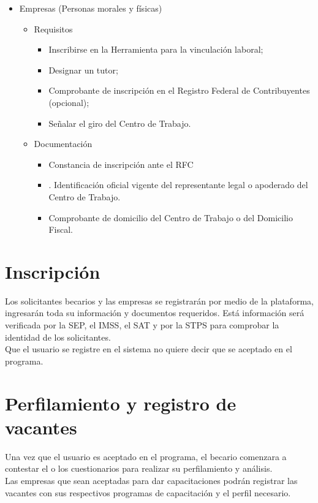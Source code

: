 \begin{itemize}
\begin{itemize}
\begin{itemize}
                \end{itemize}
        \end{itemize}
    \item Empresas (Personas morales y físicas)
        \begin{itemize}
            \item Requisitos
            \begin{itemize}
                \item Inscribirse en la Herramienta para la vinculación laboral; 
                \item Designar un tutor; 
                \item Comprobante de inscripción en el Registro Federal de Contribuyentes (opcional); 
                \item Señalar el giro del Centro de Trabajo.
            \end{itemize}
            \item Documentación
            \begin{itemize}
                \item Constancia de inscripción ante el RFC 
                \item. Identificación oficial vigente del representante legal o apoderado del Centro de Trabajo. 
                \item Comprobante de domicilio del Centro de Trabajo o del Domicilio Fiscal. 
                
            \end{itemize}
        \end{itemize}
\end{itemize}

\section{Inscripción}
Los solicitantes becarios y las empresas se registrarán por medio de la plataforma, ingresarán toda su información y documentos requeridos. Está información será verificada por la SEP, el IMSS, el SAT y por la STPS para comprobar la identidad de los solicitantes.\\
Que el usuario se registre en el sistema no quiere decir que se aceptado en el programa.\\
\section{Perfilamiento y registro de vacantes}
Una vez que el usuario es aceptado en el programa, el becario comenzara a contestar el o los cuestionarios para realizar su perfilamiento y análisis.\\
Las empresas que sean aceptadas para dar capacitaciones podrán registrar las vacantes con sus respectivos programas de capacitación y el perfil necesario.\\
